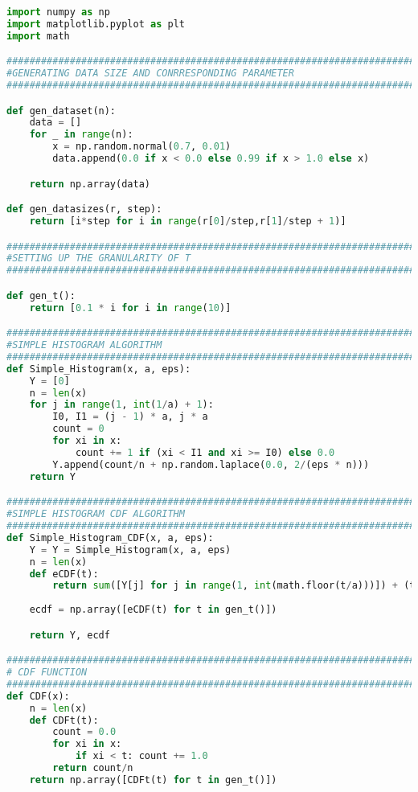 
\begin{lstlisting}[label=code-alg2, language=Python, caption=Python Code For Algorithm 2 Simple Histogram CDF]
import numpy as np
import matplotlib.pyplot as plt
import math

#############################################################################
#GENERATING DATA SIZE AND CONRRESPONDING PARAMETER
#############################################################################

def gen_dataset(n):
	data = []
	for _ in range(n):
		x = np.random.normal(0.7, 0.01)
		data.append(0.0 if x < 0.0 else 0.99 if x > 1.0 else x)

	return np.array(data)

def gen_datasizes(r, step):
	return [i*step for i in range(r[0]/step,r[1]/step + 1)]

#############################################################################
#SETTING UP THE GRANULARITY OF T
#############################################################################

def gen_t():
	return [0.1 * i for i in range(10)]

#############################################################################
#SIMPLE HISTOGRAM ALGORITHM
#############################################################################
def Simple_Histogram(x, a, eps):
	Y = [0]
	n = len(x)
	for j in range(1, int(1/a) + 1):
		I0, I1 = (j - 1) * a, j * a
		count = 0
		for xi in x:
			count += 1 if (xi < I1 and xi >= I0) else 0.0
		Y.append(count/n + np.random.laplace(0.0, 2/(eps * n)))
	return Y

#############################################################################
#SIMPLE HISTOGRAM CDF ALGORITHM
#############################################################################
def Simple_Histogram_CDF(x, a, eps):
	Y = Y = Simple_Histogram(x, a, eps)
	n = len(x)
	def eCDF(t):
		return sum([Y[j] for j in range(1, int(math.floor(t/a)))]) + (t/a - math.floor(t/a)) * Y[int(math.floor(t/a)) + 1]
	
	ecdf = np.array([eCDF(t) for t in gen_t()])

	return Y, ecdf

#############################################################################
# CDF FUNCTION
#############################################################################
def CDF(x):
	n = len(x)
	def CDFt(t):
		count = 0.0
		for xi in x:
			if xi < t: count += 1.0
		return count/n
	return np.array([CDFt(t) for t in gen_t()])



\end{lstlisting}
